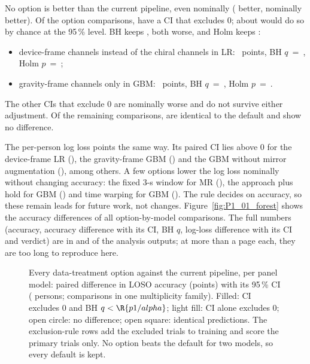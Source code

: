 No option is better than the current pipeline, even nominally ( better,
 nominally better). Of the  option comparisons,
 have a CI that excludes 0; about  would do so by
chance at the 95\,\% level. BH keeps , both worse, and Holm keeps
:
\begin{itemize}[nosep]
\item device-frame channels instead of the chiral channels in LR: ~points,
  BH $q$~=~, Holm $p$~=~;
\item gravity-frame channels only in GBM: ~points,
  BH $q$~=~, Holm $p$~=~.
\end{itemize}
The other  CIs that exclude 0 are nominally worse and do not survive either
adjustment. Of the remaining comparisons,  are identical to the default and
 show no difference.

The per-person log loss points the same way. Its paired CI lies above 0 for the device-frame LR
(), the gravity-frame GBM () and the GBM
without mirror augmentation (), among others.
A few options lower the log loss nominally without changing accuracy: the fixed 3-s window for MR
(), the approach plus hold for GBM () and time warping
for GBM (). The rule decides on accuracy, so these remain leads for future work,
not changes.
Figure~\ref{fig:P1_01_forest} shows the accuracy differences of all 
option-by-model comparisons. The full numbers (accuracy, accuracy difference with its CI, BH $q$, log-loss
difference with its CI and verdict) are in  and  of the
analysis outputs; at more than a page each, they are too long to reproduce here.

\begin{figure}[p]
\centering
{}
\caption{Every data-treatment option against the current pipeline, per panel model: paired difference in
LOSO accuracy (points) with its 95\,\% CI ( persons;  comparisons in
one multiplicity family). Filled: CI excludes 0 and BH $q < \R{p1/alpha}$; light fill: CI alone excludes 0;
open circle: no difference; open square: identical predictions. The exclusion-rule rows add the excluded
trials to training and score the primary trials only. No option beats the default for two models, so every
default is kept.}
\label{fig:P1_01_forest}\label{fig:app:prep-forest}
\end{figure}

